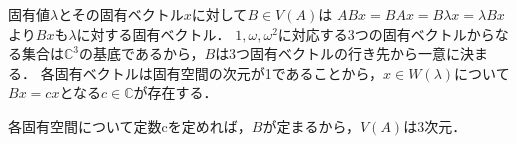 \documentclass[
		book,
		head_space=20mm,
		foot_space=20mm,
		gutter=10mm,
		line_length=190mm
]{jlreq}
\begin{document}
固有値$\lambda$とその固有ベクトル$x$に対して$B\in V(A)$は
$AB x=BAx=B\lambda x=\lambda Bx$より$Bx$も$\lambda$に対する固有ベクトル．
$1,\omega,\omega^2$に対応する3つの固有ベクトルからなる集合は$\mathbb{C}^3$の基底であるから，$B$は3つ固有ベクトルの行き先から一意に決まる．
各固有ベクトルは固有空間の次元が1であることから，$x\in W(\lambda)$について$Bx=cx$となる$c\in \mathbb{C}$が存在する．

各固有空間について定数cを定めれば，$B$が定まるから，$V(A)$は3次元．
\end{document}
